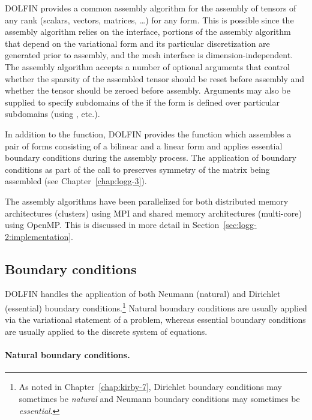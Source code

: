 DOLFIN provides a common assembly algorithm for the assembly of tensors
of any rank (scalars, vectors, matrices, \ldots) for any form. This is
possible since the assembly algorithm relies on the 
interface, portions of the assembly algorithm that depend on the
variational form and its particular discretization are generated prior to
assembly, and the mesh interface is dimension-independent.  The assembly
algorithm accepts a number of optional arguments that control whether
the sparsity of the assembled tensor should be reset before assembly
and whether the tensor should be zeroed before assembly. Arguments may
also be supplied to specify subdomains of the  if the form is
defined over particular subdomains (using ,  etc.).

In addition to the  function, DOLFIN provides the
 function which assembles a pair of forms
consisting of a bilinear and a linear form and applies essential
boundary conditions during the assembly process. The application of
boundary conditions as part of the call to 
preserves symmetry of the matrix being assembled (see
Chapter~\ref{chap:logg-3}).

The assembly algorithms have been parallelized for both distributed
memory architectures (clusters) using MPI and shared memory
architectures (multi-core) using OpenMP. This is discussed in more detail in
Section~\ref{sec:logg-2:implementation}.

\subsection{Boundary conditions}

DOLFIN handles the application of both Neumann (natural) and Dirichlet
(essential) boundary conditions.\footnote{As noted in
  Chapter~\ref{chap:kirby-7}, Dirichlet boundary conditions may
  sometimes be \emph{natural} and Neumann boundary conditions may
  sometimes be \emph{essential}.} Natural boundary conditions are
usually applied via the variational statement of a problem, whereas
essential boundary conditions are usually applied to the discrete
system of equations.

\paragraph{Natural boundary conditions.}

